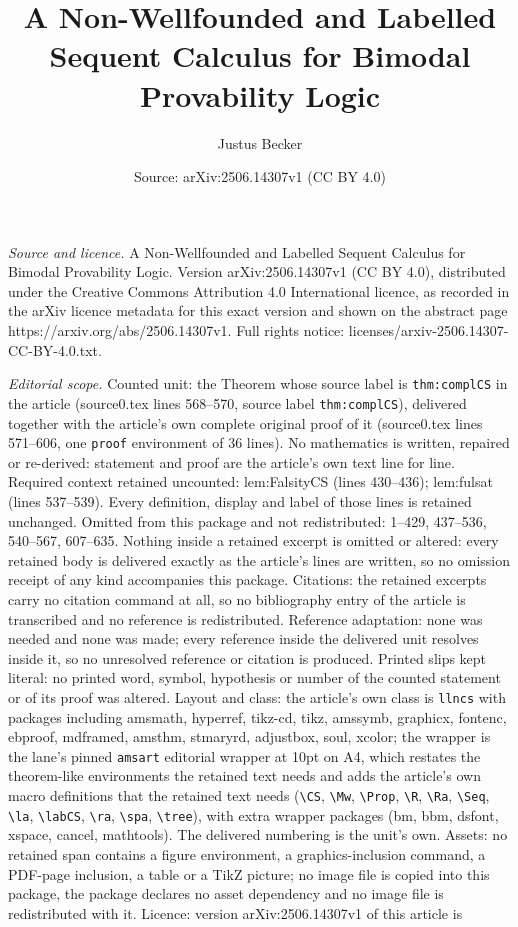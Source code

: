 \documentclass[10pt,a4paper]{amsart}
\title[A Non-Wellfounded and Labelled Sequent Calculus for Bimodal ]{A Non-Wellfounded and Labelled Sequent Calculus for Bimodal Provability Logic}
\author{Justus Becker}
\date{Source: arXiv:2506.14307v1 (CC BY 4.0)}
\begin{document}
\maketitle

\noindent\emph{Source and licence.} A Non-Wellfounded and Labelled Sequent Calculus for Bimodal Provability Logic. Version arXiv:2506.14307v1 (CC BY 4.0), distributed under the Creative Commons Attribution 4.0 International licence, as recorded in the arXiv licence metadata for this exact version and shown on the abstract page https://arxiv.org/abs/2506.14307v1. Full rights notice: licenses/arxiv-2506.14307-CC-BY-4.0.txt.\par\smallskip

\noindent\textit{Editorial scope.} Counted unit: the Theorem whose source label is \texttt{thm:complCS} in the article (source0.tex lines 568--570, source label \texttt{thm:complCS}), delivered together with the article's own complete original proof of it (source0.tex lines 571--606, one \texttt{proof} environment of 36 lines). No mathematics is written, repaired or re-derived: statement and proof are the article's own text line for line. Required context retained uncounted: lem:FalsityCS (lines 430--436); lem:fulsat (lines 537--539). Every definition, display and label of those lines is retained unchanged. Omitted from this package and not redistributed: 1--429, 437--536, 540--567, 607--635. Nothing inside a retained excerpt is omitted or altered: every retained body is delivered exactly as the article's lines are written, so no omission receipt of any kind accompanies this package. Citations: the retained excerpts carry no citation command at all, so no bibliography entry of the article is transcribed and no reference is redistributed. Reference adaptation: none was needed and none was made; every reference inside the delivered unit resolves inside it, so no unresolved reference or citation is produced. Printed slips kept literal: no printed word, symbol, hypothesis or number of the counted statement or of its proof was altered. Layout and class: the article's own class is \texttt{llncs} with packages including amsmath, hyperref, tikz-cd, tikz, amssymb, graphicx, fontenc, ebproof, mdframed, amsthm, stmaryrd, adjustbox, soul, xcolor; the wrapper is the lane's pinned \texttt{amsart} editorial wrapper at 10pt on A4, which restates the theorem-like environments the retained text needs and adds the article's own macro definitions that the retained text needs (\texttt{\textbackslash CS}, \texttt{\textbackslash Mw}, \texttt{\textbackslash Prop}, \texttt{\textbackslash R}, \texttt{\textbackslash Ra}, \texttt{\textbackslash Seq}, \texttt{\textbackslash la}, \texttt{\textbackslash labCS}, \texttt{\textbackslash ra}, \texttt{\textbackslash spa}, \texttt{\textbackslash tree}), with extra wrapper packages (bm, bbm, dsfont, xspace, cancel, mathtools). The delivered numbering is the unit's own. Assets: no retained span contains a figure environment, a graphics-inclusion command, a PDF-page inclusion, a table or a TikZ picture; no image file is copied into this package, the package declares no asset dependency and no image file is redistributed with it. Licence: version arXiv:2506.14307v1 of this article is 
\end{document}
